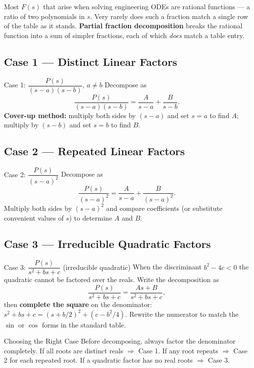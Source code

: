 \documentclass[12pt,a4paper]{article}
\begin{document}
Most $F(s)$ that arise when solving engineering ODEs are rational functions ---
a ratio of two polynomials in $s$.  Very rarely does such a fraction match a
single row of the table as it stands.  \textbf{Partial fraction decomposition}
breaks the rational function into a sum of simpler fractions, each of which
\emph{does} match a table entry.

\subsection{Case 1 --- Distinct Linear Factors}

\begin{infobox}{Case 1: $\dfrac{P(s)}{(s-a)(s-b)}$, \; $a \neq b$}
Decompose as
\[
    \frac{P(s)}{(s-a)(s-b)} = \frac{A}{s-a} + \frac{B}{s-b}.
\]
\textbf{Cover-up method:} multiply both sides by $(s-a)$ and set $s=a$ to find
$A$; multiply by $(s-b)$ and set $s=b$ to find $B$.
\end{infobox}

\subsection{Case 2 --- Repeated Linear Factors}

\begin{infobox}{Case 2: $\dfrac{P(s)}{(s-a)^{2}}$}
Decompose as
\[
    \frac{P(s)}{(s-a)^{2}} = \frac{A}{s-a} + \frac{B}{(s-a)^{2}}.
\]
Multiply both sides by $(s-a)^{2}$ and compare coefficients (or substitute
convenient values of $s$) to determine $A$ and $B$.
\end{infobox}

\subsection{Case 3 --- Irreducible Quadratic Factors}

\begin{infobox}{Case 3: $\dfrac{P(s)}{s^{2}+bs+c}$ (irreducible quadratic)}
When the discriminant $b^{2}-4c < 0$ the quadratic cannot be factored over
the reals.  Write the decomposition as
\[
    \frac{P(s)}{s^{2}+bs+c} = \frac{As+B}{s^{2}+bs+c},
\]
then \textbf{complete the square} on the denominator:
$s^{2}+bs+c = (s+b/2)^{2} + (c - b^{2}/4)$.
Rewrite the numerator to match the $\sin$ or $\cos$ forms in the standard table.
\end{infobox}

\begin{learnbox}{Choosing the Right Case}
Before decomposing, always factor the denominator completely.  If all roots are
distinct reals $\Rightarrow$ Case 1.  If any root repeats $\Rightarrow$ Case 2
for each repeated root.  If a quadratic factor has no real roots $\Rightarrow$
Case 3.
\end{learnbox}
\end{document}
